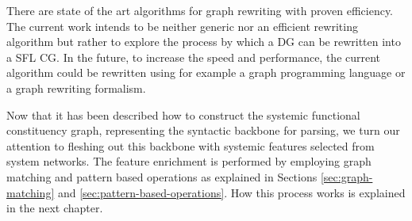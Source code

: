    There are state of the art algorithms for graph rewriting with proven efficiency. The current work intends to be neither generic nor an efficient rewriting algorithm but rather to explore the process by which a DG can be rewritten into a SFL CG. In the future, to increase the speed and performance, the current algorithm could be rewritten using for example a graph programming language or a graph rewriting formalism. 

    Now that it has been described how to construct the systemic functional constituency graph, representing the syntactic backbone for parsing, we turn our attention to fleshing out this backbone with systemic features selected from system networks. The feature enrichment is performed by employing graph matching and pattern based operations as explained in Sections \ref{sec:graph-matching} and \ref{sec:pattern-based-operations}. How this process works is explained in the next chapter.
    



